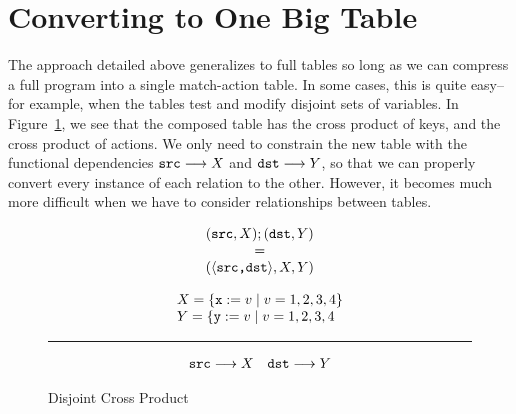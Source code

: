 \section{Converting to One Big Table}

The approach detailed above generalizes to full tables so long as we
can compress a full program into a single match-action table. In some
cases, this is quite easy--for example, when the tables test and
modify disjoint sets of variables. In Figure~\ref{fig:cross-product-ex},
we see that the composed table has the cross product of keys, and the
cross product of actions. We only need to constrain the new table with
the functional dependencies $\texttt{src} \longrightarrow X$ and
$\texttt{dst} \longrightarrow Y$, so that we can properly convert
every instance of each relation to the other. However, it becomes much
more difficult when we have to consider relationships between tables.

\begin{figure}[ptb]
  \begin{minipage}{0.32\columnwidth}
  \[\begin{array}{c}
      (\texttt{src}, X); (\texttt{dst}, Y)
      \\ = \\
      (\langle\texttt{src,dst}\rangle, X, Y)
    \end{array} \]
\end{minipage} \hfill \vline \hfill \begin{minipage}{0.66\columnwidth}
  \[\begin{array}l
      X = \{\var x:=v \mid v = 1,2,3,4\}\\
      Y = \{\var y:=v \mid v = 1,2,3,4
    \end{array}\]
  \hrule
  \[\begin{array}{cc}
      \texttt{src} \longrightarrow X
      &\texttt{dst} \longrightarrow Y
    \end{array} \]
\end{minipage}
\caption{Disjoint Cross Product}
  \label{fig:cross-product-ex}
\end{figure}

